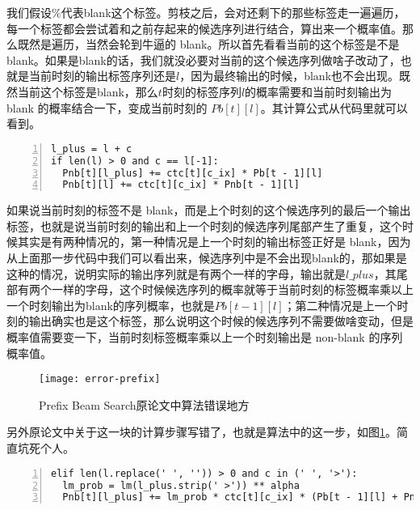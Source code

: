 我们假设$\%$代表blank这个标签。剪枝之后，会对还剩下的那些标签走一遍遍历，每一个标签都会尝试着和之前存起来的候选序列进行结合，算出来一个概率值。那么既然是遍历，当然会轮到牛逼的 blank。所以首先看看当前的这个标签是不是blank。如果是blank的话，我们就没必要对当前的这个候选序列做啥子改动了，也就是当前时刻的输出标签序列还是$l$，因为最终输出的时候，blank也不会出现。既然当前这个标签是blank，那么$t$时刻的标签序列$l$的概率需要和当前时刻输出为 blank 的概率结合一下，变成当前时刻的 $Pb[t][l]$。其计算公式从代码里就可以看到。

\begin{lstlisting}[language = shell, numbers=left, 
         numberstyle=\tiny,keywordstyle=\color{blue!70},
         commentstyle=\color{red!50!green!50!blue!50},frame=shadowbox,
         rulesepcolor=\color{red!20!green!20!blue!20},basicstyle=\ttfamily]
l_plus = l + c
if len(l) > 0 and c == l[-1]:
  Pnb[t][l_plus] += ctc[t][c_ix] * Pb[t - 1][l]
  Pnb[t][l] += ctc[t][c_ix] * Pnb[t - 1][l]
\end{lstlisting}

如果说当前时刻的标签不是 blank，而是上个时刻的这个候选序列的最后一个输出标签，也就是说当前时刻的输出和上一个时刻的候选序列尾部产生了重复，这个时候其实是有两种情况的，第一种情况是上一个时刻的输出标签正好是 blank，因为从上面那一步代码中我们可以看出来，候选序列中是不会出现blank的，那如果是这种的情况，说明实际的输出序列就是有两个一样的字母，输出就是$l\_plus$，其尾部有两个一样的字母，这个时候候选序列的概率就等于当前时刻的标签概率乘以上一个时刻输出为blank的序列概率，也就是$Pb[t - 1][l]$；第二种情况是上一个时刻的输出确实也是这个标签，那么说明这个时候的候选序列不需要做啥变动，但是概率值需要变一下，当前时刻标签概率乘以上一个时刻输出是 non-blank 的序列概率值。

\begin{figure}[h]
  \centering
  \texttt{[image: error-prefix]}
  \caption{Prefix Beam Search原论文中算法错误地方 \label{fig:error-prefix}}
\end{figure}

另外原论文中关于这一块的计算步骤写错了，也就是算法中的这一步，如图\ref{fig:error-prefix}。简直坑死个人。

\begin{lstlisting}[language = shell, numbers=left, 
         numberstyle=\tiny,keywordstyle=\color{blue!70},
         commentstyle=\color{red!50!green!50!blue!50},frame=shadowbox,
         rulesepcolor=\color{red!20!green!20!blue!20},basicstyle=\ttfamily]
elif len(l.replace(' ', '')) > 0 and c in (' ', '>'):
  lm_prob = lm(l_plus.strip(' >')) ** alpha
  Pnb[t][l_plus] += lm_prob * ctc[t][c_ix] * (Pb[t - 1][l] + Pnb[t - 1][l])
\end{lstlisting}

